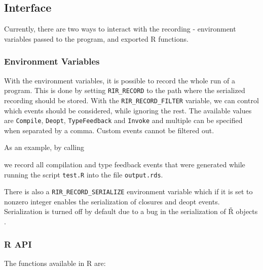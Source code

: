 \subsection{Interface}

Currently, there are two ways to interact with the recording - environment variables passed to the program, and exported R functions.

\subsubsection*{Environment Variables}

With the environment variables, it is possible to record the whole run of a program. This is done by setting \texttt{RIR\_RECORD} to the path where the serialized recording should be stored. With the \texttt{RIR\_RECORD\_FILTER} variable, we can control which events should be considered, while ignoring the rest. The available values are \texttt{Compile}, \texttt{Deopt}, \texttt{TypeFeedback} and \texttt{Invoke} and multiple can be specified when separated by a comma. Custom events cannot be filtered out.

As an example, by calling


\noindent we record all compilation and type feedback events that were generated while running the script \texttt{test.R} into the file \texttt{output.rds}.

There is also a \texttt{RIR\_RECORD\_SERIALIZE} environment variable which if it is set to nonzero integer enables the serialization of closures and deopt events. Serialization is turned off by default due to a bug in the serialization of Ř objects .

\subsubsection*{R API}

The functions available in R are: 

